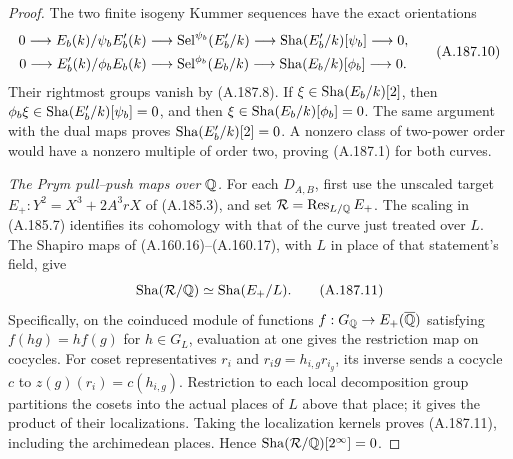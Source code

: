 \begin{proof}
The two finite isogeny Kummer sequences have the exact
orientations
\[
\begin{aligned}
0\longrightarrow E_b(k)/\psi_bE_b'(k)
 &\longrightarrow\operatorname{Sel}^{\psi_b}(E_b'/k)
 \longrightarrow\operatorname{Sha}(E_b'/k)[\psi_b]\longrightarrow0,\\
0\longrightarrow E_b'(k)/\phi_bE_b(k)
 &\longrightarrow\operatorname{Sel}^{\phi_b}(E_b/k)
 \longrightarrow\operatorname{Sha}(E_b/k)[\phi_b]\longrightarrow0.
\end{aligned}
\tag{A.187.10}
\]
Their rightmost groups vanish by (A.187.8).
If \(\xi\in\operatorname{Sha}(E_b/k)[2]\), then
\(\phi_b\xi\in\operatorname{Sha}(E_b'/k)[\psi_b]=0\), and
then \(\xi\in\operatorname{Sha}(E_b/k)[\phi_b]=0\).
The same argument with the dual maps proves
\(\operatorname{Sha}(E_b'/k)[2]=0\).  A nonzero class of
two-power order would have a nonzero multiple of order
two, proving (A.187.1) for both curves.

\emph{The Prym pull--push maps over \(\mathbb Q\).}
For each \(D_{A,B}\), first use the unscaled target
\(E_+:Y^2=X^3+2A^3rX\) of (A.185.3), and set
\(\mathcal R=\operatorname{Res}_{L/\mathbb Q}E_+\).
The scaling in (A.185.7) identifies its cohomology
with that of the curve just treated over \(L\).
The Shapiro maps of (A.160.16)--(A.160.17), with \(L\)
in place of that statement's field, give
\[
                  \operatorname{Sha}(\mathcal R/\mathbb Q)
                     \simeq\operatorname{Sha}(E_+/L).
\tag{A.187.11}
\]
Specifically, on the coinduced module of functions
\(f:G_\mathbb Q\to E_+(\overline{\mathbb Q})\) satisfying
\(f(hg)=hf(g)\) for \(h\in G_L\), evaluation at
one gives the restriction map on cocycles.  For coset
representatives \(r_i\) and
\(r_i g=h_{i,g}r_{i_g}\), its inverse sends a cocycle
\(c\) to \(z(g)(r_i)=c(h_{i,g})\).
Restriction to each local decomposition group partitions
the cosets into the actual places of \(L\) above that
place; it gives the product of their localizations.
Taking the localization kernels proves (A.187.11),
including the archimedean places.  Hence
\(\operatorname{Sha}(\mathcal R/\mathbb Q)[2^\infty]=0\).


\end{proof}
